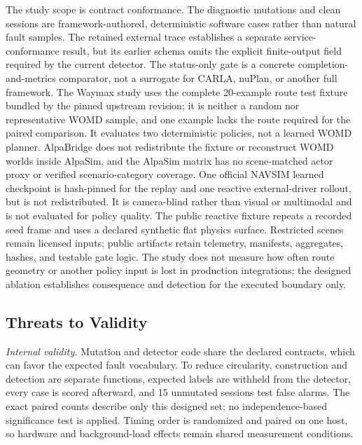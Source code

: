 \documentclass[a4paper,10pt,conference]{ieeeconf}
\begin{document}
The study scope is contract conformance. The diagnostic mutations and clean sessions
are framework-authored, deterministic software cases rather than natural fault
samples. The retained external trace establishes a separate service-conformance result,
but its earlier schema omits the explicit finite-output field required by the current
detector. The status-only gate is a concrete
completion-and-metrics comparator, not a surrogate for CARLA, nuPlan, or another full
framework. The Waymax study uses the complete 20-example route test fixture bundled by
the pinned upstream revision; it is neither a random nor representative WOMD sample,
and one example lacks the route required for the paired comparison. It evaluates two
deterministic policies, not a learned WOMD planner. AlpaBridge does not redistribute the
fixture or reconstruct WOMD worlds inside AlpaSim, and the AlpaSim matrix has no
scene-matched actor proxy or verified scenario-category coverage. One official NAVSIM
learned checkpoint is hash-pinned for the replay and one reactive external-driver
rollout, but is not redistributed. It is camera-blind rather than visual or multimodal
and is not evaluated for policy quality. The public reactive fixture repeats a recorded
seed frame and uses a declared synthetic flat physics surface. Restricted scenes remain
licensed inputs; public artifacts retain telemetry, manifests, aggregates, hashes, and
testable gate logic.
The study does not measure how often route geometry or another policy input is lost in
production integrations; the designed ablation establishes consequence and detection
for the executed boundary only.

\subsection{Threats to Validity}

\emph{Internal validity.} Mutation and detector code share the declared contracts,
which can favor the expected fault vocabulary. To reduce circularity, construction and
detection are separate functions, expected labels are withheld from the detector, every
case is scored afterward, and 15 unmutated sessions test false alarms. The exact paired
counts describe only this designed set; no independence-based significance test is
applied. Timing order is randomized and paired on one host, so hardware and
background-load effects remain shared measurement conditions.
\end{document}
